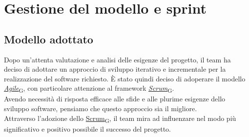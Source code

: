 
\section{Gestione del modello e sprint}
\subsection{Modello adottato}
Dopo un'attenta valutazione e analisi delle esigenze del progetto, il team ha deciso di adottare un approccio di sviluppo iterativo e incrementale per la realizzazione del software richiesto. È stato quindi deciso di adoperare il modello \href{https://7last.github.io/docs/rtb/documentazione-interna/glossario\#agile}{\textit{Agile}\textsubscript{G}}, con particolare attenzione al framework \href{https://7last.github.io/docs/rtb/documentazione-interna/glossario\#scrum}{\textit{Scrum}\textsubscript{G}}.\\
Avendo necessità di risposta efficace alle sfide e alle plurime esigenze dello sviluppo software, pensiamo che questo approccio sia il migliore.\\
Attraverso l'adozione dello \href{https://7last.github.io/docs/rtb/documentazione-interna/glossario\#scrum}{Scrum\textsubscript{G}}, il team mira ad influenzare nel modo più significativo e positivo possibile il successo del progetto.
